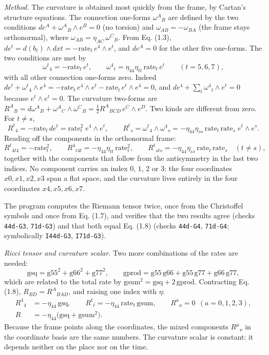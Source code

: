 \documentclass[
  10pt,
]{article}
\begin{document}
\emph{Method.} The curvature is obtained most quickly from the frame, by
Cartan's structure equations. The connection one-forms \(\omega^A{}_B\)
are defined by the two conditions \(de^A+\omega^A{}_B\wedge e^B=0\) (no
torsion) and \(\omega_{AB}=-\omega_{BA}\) (the frame stays orthonormal),
where \(\omega_{AB}=\eta_{AC}\,\omega^C{}_B\). From Eq. (1.3),
\(de^t=d(b_t)\wedge dxt=-\mathrm{rate}_t\,e^4\wedge e^t\), and
\(de^A=0\) for the other five one-forms. The two conditions are met by
\[\omega^t{}_4=-\mathrm{rate}_t\,e^t,\qquad
\omega^4{}_t=\eta_{44}\eta_{tt}\,\mathrm{rate}_t\,e^t\qquad(t=5,6,7),\tag{1.7}\]
with all other connection one-forms zero. Indeed
\(de^t+\omega^t{}_4\wedge e^4=-\mathrm{rate}_t\,e^4\wedge e^t-\mathrm{rate}_t\,e^t\wedge e^4=0\),
and \(de^4+\sum_t\omega^4{}_t\wedge e^t=0\) because \(e^t\wedge e^t=0\).
The curvature two-forms are
\(R^A{}_B=d\omega^A{}_B+\omega^A{}_C\wedge\omega^C{}_B=\tfrac12R^A{}_{BCD}\,e^C\wedge e^D\).
Two kinds are different from zero. For \(t\neq s\),
\[R^t{}_4=-\mathrm{rate}_t\,de^t=\mathrm{rate}_t^2\;e^4\wedge e^t,\qquad
R^t{}_s=\omega^t{}_4\wedge\omega^4{}_s=-\eta_{44}\eta_{ss}\,\mathrm{rate}_t\,\mathrm{rate}_s\;e^t\wedge e^s .\]
Reading off the components in the orthonormal frame:
\[R^t{}_{4t4}=-\mathrm{rate}_t^2,\qquad R^4{}_{t4t}=-\eta_{44}\eta_{tt}\,\mathrm{rate}_t^2,\qquad
R^t{}_{sts}=-\eta_{44}\eta_{ss}\,\mathrm{rate}_t\,\mathrm{rate}_s\quad(t\neq s),\tag{1.8}\]
together with the components that follow from the antisymmetry in the
last two indices. No component carries an index \(0\), \(1\), \(2\) or
\(3\): the four coordinates \(x0,x1,x2,x3\) span a flat space, and the
curvature lives entirely in the four coordinates \(x4,x5,x6,x7\).

The program computes the Riemann tensor twice, once from the Christoffel
symbols and once from Eq. (1.7), and verifies that the two results agree
(checks \texttt{44d-G3}, \texttt{71d-G3}) and that both equal Eq. (1.8)
(checks \texttt{44d-G4}, \texttt{71d-G4}; symbolically \texttt{I44d-G3},
\texttt{I71d-G3}).

\emph{Ricci tensor and curvature scalar.} Two more combinations of the
rates are needed:
\[\mathrm{gsq}=\mathrm{g55}^2+\mathrm{g66}^2+\mathrm{g77}^2,\qquad
\mathrm{gprod}=\mathrm{g55}\,\mathrm{g66}+\mathrm{g55}\,\mathrm{g77}+\mathrm{g66}\,\mathrm{g77},\]
which are related to the total rate by
\(\mathrm{gsum}^2=\mathrm{gsq}+2\,\mathrm{gprod}\). Contracting Eq.
(1.8), \(R_{BD}=R^A{}_{BAD}\), and raising one index with \(\eta\):
\[\begin{aligned}R^4{}_4&=-\eta_{44}\,\mathrm{gsq},\qquad R^t{}_t=-\eta_{44}\,\mathrm{rate}_t\,\mathrm{gsum},\qquad
R^a{}_a=0\ \ (a=0,1,2,3),\\ R&=-\eta_{44}\big(\mathrm{gsq}+\mathrm{gsum}^2\big).\end{aligned}\tag{1.9}\]
Because the frame points along the coordinates, the mixed components
\(R^\mu{}_\nu\) in the coordinate basis are the same numbers. The
curvature scalar is constant: it depends neither on the place nor on the
time.
\end{document}
